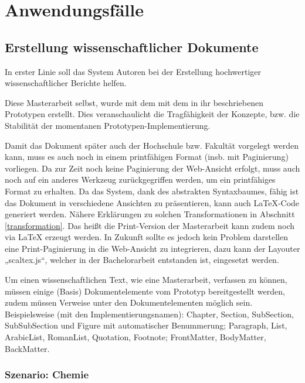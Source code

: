  
\chapter{Anwendungsfälle}\label{}
 
\section{Erstellung wissenschaftlicher Dokumente}\label{wiss-dok-abschnitt}
 
In erster Linie soll das System Autoren bei der Erstellung hochwertiger wissenschaftlicher Berichte helfen.

 
Diese Masterarbeit selbst, wurde mit dem mit dem in ihr beschriebenen Prototypen erstellt. Dies veranschaulicht die Tragfähigkeit der Konzepte, bzw. die Stabilität der momentanen Prototypen-Implementierung.

 
Damit das Dokument später auch der Hochschule bzw. Fakultät vorgelegt werden kann, muss es auch noch in einem printfähigen Format (insb. mit Paginierung) vorliegen.  Da zur Zeit noch keine Paginierung der Web-Ansicht erfolgt, muss auch noch auf ein anderes Werkzeug zurückgegriffen werden, um ein printfähiges Format zu erhalten. Da das System, dank des abstrakten Syntaxbaumes, fähig ist das Dokument in verschiedene Ansichten zu präsentieren, kann auch LaTeX-Code generiert werden.  Nähere Erklärungen zu solchen Transformationen in Abschnitt \ref{transformation}. Das heißt die Print-Version der Masterarbeit kann zudem noch via LaTeX erzeugt werden. In Zukunft sollte es jedoch kein Problem darstellen eine Print-Paginierung in die Web-Ansicht zu integrieren, dazu kann der Layouter „scaltex.js“, welcher in der Bachelorarbeit \citep{Hodapp} entstanden ist, eingesetzt werden.

 
Um einen wissenschaftlichen Text, wie eine Masterarbeit, verfassen zu können, müssen einige (Basis) Dokumentelemente vom Prototyp bereitgestellt werden, zudem müssen Verweise unter den Dokumentelementen möglich sein. Beispielsweise (mit den Implementierungsnamen): Chapter, Section, SubSection, SubSubSection und Figure mit automatischer Benummerung; Paragraph, List, ArabicList, RomanList, Quotation, Footnote; FrontMatter, BodyMatter, BackMatter.

 
\subsection{Szenario: Chemie}\label{chemie-szenario}
 
